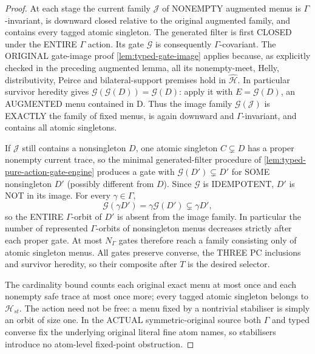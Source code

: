 \begin{proof}
At each stage the current family
$\mathcal J$ of NONEMPTY augmented
menus is $\Gamma$-invariant, is
downward closed relative to the
original augmented family, and
contains every tagged atomic
singleton. The generated filter
is first CLOSED under the ENTIRE
$\Gamma$ action. Its gate
$\mathcal G$ is consequently
$\Gamma$-covariant. The ORIGINAL
gate-image proof
\cref{lem:typed-gate-image}
applies because, as explicitly
checked in the preceding augmented
lemma, all its nonempty-meet,
Helly, distributivity, Peirce
and bilateral-support premises
hold in $\widehat{\mathcal H}$.
In particular survivor heredity
gives
$\mathcal G(\mathcal G(D))=\mathcal G(D)$:
apply it with $E=\mathcal G(D)$,
an AUGMENTED menu contained in D.
Thus the image family
$\mathcal G(\mathcal J)$ is EXACTLY
the family of fixed menus, is again
downward and $\Gamma$-invariant,
and contains all atomic singletons.

If $\mathcal J$ still contains a
nonsingleton $D$, one atomic
singleton $C\subsetneq D$ has a
proper nonempty current trace,
so the minimal generated-filter
procedure of
\cref{lem:typed-pure-action-gate-engine}
produces a gate with
$\mathcal G(D')\subsetneq D'$
for SOME nonsingleton $D'$
(possibly different from $D$).
Since $\mathcal G$ is
IDEMPOTENT, $D'$ is NOT in its
image. For every $\gamma\in\Gamma$,
\[
 \mathcal G(\gamma D')
       =\gamma\mathcal G(D')
                         \subsetneq\gamma D',
\]
so the ENTIRE $\Gamma$-orbit of
$D'$ is absent from the image
family. In particular the number
of represented $\Gamma$-orbits
of nonsingleton menus decreases
strictly after each proper gate.
At most $N_\Gamma$ gates therefore
reach a family consisting only of
atomic singleton menus. All gates
preserve converse, the THREE PC
inclusions and survivor heredity,
so their composite after $T$
is the desired selector.

The cardinality bound counts
each original exact menu at most
once and each nonempty safe trace
at most once more; every tagged
atomic singleton belongs to
$\mathcal H_{st}$. The action
need not be free: a menu fixed
by a nontrivial stabiliser is
simply an orbit of size one.
In the ACTUAL symmetric-original
source both $\Gamma$ and typed
converse fix the underlying
original literal fine atom names,
so stabilisers introduce no
atom-level fixed-point obstruction.
\end{proof}

